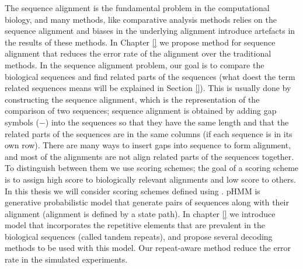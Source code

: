 The sequence alignment is the fundamental problem in the computational biology,
and many methods, like comparative analysis methods relies on the sequence
alignment and biases in the underlying alignment introduce artefacts in the
results of these methods. In Chapter \ref{} we propose method for sequence
alignment that reduces the error rate of the alignment over the traditional
methods. In the sequence alignment problem, our goal is to compare the
biological sequences and find related parts of the sequences (what doest the
term related sequences means will be explained in Section \ref{}). This is
usually done by constructing the sequence alignment, which is the
representation of the comparison of two sequences; sequence alignment is
obtained by adding gap symbols ($-$) into the sequences so that they have the
same length and that the related parts of the sequences are in the same columns
(if each sequence is in its own row). There are many ways to insert gaps into
sequence to form alignment, and most of the alignments are not align related
parts of the sequences together. To distinguish between them we use scoring
schemes; the goal of a scoring scheme is to assign high score to biologically
relevant alignments and low score to others. In this thesis we will consider
scoring schemes defined using .
pHMM is generative probabilistic model that generate pairs of sequences along
with their alignment (alignment is defined by a state path).  In chapter \ref{}
we introduce model that incorporates the repetitive elements that are prevalent
in the biological sequences (called tandem repeats), and propose several
decoding methods to be used with this model. Our repeat-aware method reduce the
error rate in the simulated experiments. 

